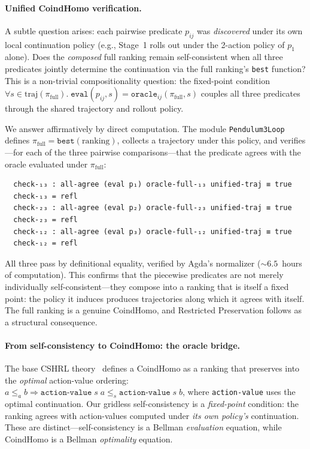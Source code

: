 \documentclass[9pt,a4paper]{article}
\theoremstyle{plain}
\theoremstyle{definition}
\theoremstyle{remark}
\begin{document}
\paragraph{Unified CoindHomo verification.}
A subtle question arises: each pairwise predicate $p_{ij}$ was \emph{discovered} under its own local continuation policy (e.g., Stage~1 rolls out under the 2-action policy of $p_1$ alone).  Does the \emph{composed} full ranking remain self-consistent when all three predicates jointly determine the continuation via the full ranking's \texttt{best} function?  This is a non-trivial compositionality question: the fixed-point condition $\forall s \in \mathrm{traj}(\pi_{\mathrm{full}}).\; \texttt{eval}(p_{ij}, s) = \texttt{oracle}_{ij}(\pi_{\mathrm{full}}, s)$ couples all three predicates through the shared trajectory and rollout policy.

We answer affirmatively by direct computation.  The module \texttt{Pendulum3Loop} defines $\pi_{\mathrm{full}} = \texttt{best}(\mathrm{ranking})$, collects a trajectory under this policy, and verifies---for each of the three pairwise comparisons---that the predicate agrees with the oracle evaluated under $\pi_{\mathrm{full}}$:
\begin{verbatim}
  check-₁₃ : all-agree (eval p₁) oracle-full-₁₃ unified-traj ≡ true
  check-₁₃ = refl
  check-₂₃ : all-agree (eval p₂) oracle-full-₂₃ unified-traj ≡ true
  check-₂₃ = refl
  check-₁₂ : all-agree (eval p₃) oracle-full-₁₂ unified-traj ≡ true
  check-₁₂ = refl
\end{verbatim}
All three pass by definitional equality, verified by Agda's normalizer (${\sim}6.5$~hours of computation).  This confirms that the piecewise predicates are not merely individually self-consistent---they compose into a ranking that is itself a fixed point: the policy it induces produces trajectories along which it agrees with itself.  The full ranking is a genuine CoindHomo, and Restricted Preservation follows as a structural consequence.

\paragraph{From self-consistency to CoindHomo: the oracle bridge.}
The base CSHRL theory~\cite{CSHRL2026} defines a CoindHomo as a ranking that preserves into the \emph{optimal} action-value ordering: $a \leq_a b \Rightarrow \texttt{action-value}\;s\;a \leq_s \texttt{action-value}\;s\;b$, where \texttt{action-value} uses the optimal continuation.  Our gridless self-consistency is a \emph{fixed-point} condition: the ranking agrees with action-values computed under \emph{its own policy's} continuation.  These are distinct---self-consistency is a Bellman \emph{evaluation} equation, while CoindHomo is a Bellman \emph{optimality} equation.
\end{document}
